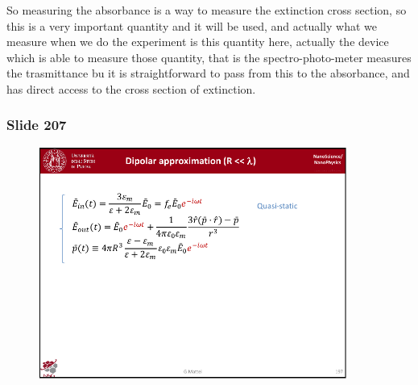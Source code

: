 \documentclass[../main/main.tex]{subfiles}
\begin{document}
So measuring the absorbance is a way to measure the extinction cross section, so this is a very important quantity and it will be used, and actually what we measure when we do the experiment is this quantity here, actually the device which is able to measure those quantity, that is the spectro-photo-meter measures the trasmittance bu it is straightforward to pass from this to the absorbance, and has direct access to the cross section of extinction.





\newpage

\subsubsection{Slide 207}

\begin{figure}[h!]
\centering
\includegraphics[page=11,width=0.9\textwidth]{../lessons/pdf_file/12_lesson.pdf}
\end{figure}







\clearpage
\end{document}
